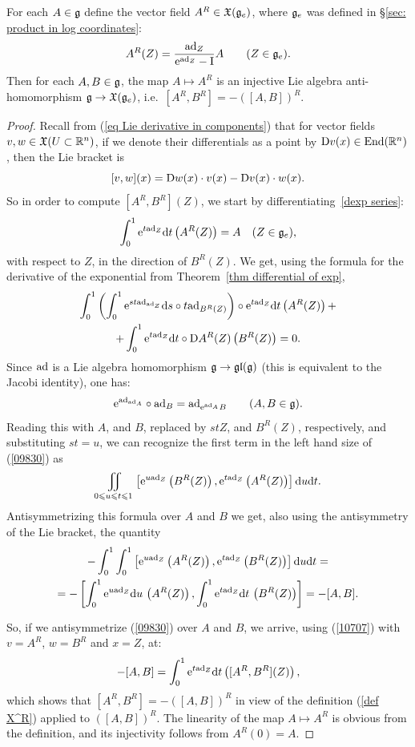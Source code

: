 \begin{lem}[{{\cite[Lem.~1.8.2]{DK}}}]
    For each $A\in\mathfrak{g}$ define the vector field $A^R\in \mathfrak{X}(\mathfrak{g}_e)$, where $\mathfrak{g}_e$ was defined in \S\ref{sec: product in log coordinates}:
    \[ A^R(Z)=\frac{\mathrm{ad}_Z}{\mathrm{e}^{\mathrm{ad}_Z}-\mathrm{I}}A\quad \quad (Z\in\mathfrak{g}_e). \label{def X^R}\]
    Then for each $A,B\in\mathfrak{g}$, the map $A\mapsto A^R$ is an injective Lie algebra anti-homomorphism $\mathfrak{g}\to \mathfrak{X}(\mathfrak{g}_e)$, i.e.\ $[A^R,B^R]=-([A,B])^R$.
\end{lem}
\begin{proof}
    Recall from (\ref{eq Lie derivative in components}) that for vector fields $v,w\in\mathfrak{X}(U\subset\mathbb{R}^n)$, if we denote their differentials as a point by $\mathrm{D} v(x)\in \operatorname{End}(\mathbb{R}^n)$, then the Lie bracket is
    \[[v,w](x)=\mathrm{D} w(x)\cdot v(x)-\mathrm{D} v(x)\cdot w(x).\label{10707}\]
    So in order to compute $[A^R,B^R](Z)$, we start by differentiating~\ref{dexp series}:
    \[\int_0^1 \mathrm{e}^{t\mathrm{ad}_Z}{\mathrm{d}} t \left(A^R(Z)\right)=A\quad (Z\in\mathfrak{g}_e),\]
    with respect to $Z$, in the direction of $B^R(Z)$. We get, using the formula for the derivative of the exponential from Theorem~\ref{thm differential of exp}, 
    \begin{multline}
        \int_0^1 \left(\int_0^1\mathrm{e}^{st\mathrm{ad}_{\mathrm{ad}_Z}} {\mathrm{d}} s\circ t\mathrm{ad}_{B^R(Z)}\right)\circ \mathrm{e}^{t\mathrm{ad}_Z}{\mathrm{d}} t\left(A^R(Z)\right)+\\
        +\int_0^1\mathrm{e}^{t\mathrm{ad}_Z}{\mathrm{d}} t\circ \mathrm{D} A^R(Z)\left(B^R(Z)\right)=0.\label{09830}
    \end{multline} 
    Since $\mathrm{ad}$ is a Lie algebra homomorphism $\mathfrak{g}\to\mathfrak{gl}(\mathfrak{g})$ (this is equivalent to the Jacobi identity), one has:
    \[\mathrm{e}^{\mathrm{ad}_{\mathrm{ad}_A}}\circ \mathrm{ad}_B=\mathrm{ad}_{\mathrm{e}^{\mathrm{ad}_A} B}\quad \quad (A,B\in\mathfrak{g}).\]
    Reading this with $A$, and $B$, replaced by $stZ$, and $B^R(Z)$, respectively, and substituting $st=u$, we can recognize the first term in the left hand size of (\ref{09830}) as
    \[\iint_{0\leqslant u\leqslant t\leqslant 1}\left[\mathrm{e}^{u\mathrm{ad}_Z}\left(B^R(Z)\right),\mathrm{e}^{t\mathrm{ad}_Z}\left(A^R(Z)\right)\right]{\mathrm{d}} u{\mathrm{d}} t.\]
    Antisymmetrizing this formula over $A$ and $B$  we get, also using the antisymmetry of the Lie bracket, the quantity
    \begin{multline}
        -\int_0^1\int_0^1\left[\mathrm{e}^{u\mathrm{ad}_Z}\left(A^R(Z)\right),\mathrm{e}^{t\mathrm{ad}_Z}\left(B^R(Z)\right)\right]{\mathrm{d}} u{\mathrm{d}} t=\\
        =-\left[\int_0^1\mathrm{e}^{u\mathrm{ad}_Z}{\mathrm{d}} u\, \left(A^R(Z)\right),\int_0^1\mathrm{e}^{t\mathrm{ad}_Z}{\mathrm{d}} t\, \left(B^R(Z)\right)\right]=-[A,B].
    \end{multline}

    So, if we antisymmetrize (\ref{09830}) over $A$ and $B$, we arrive, using (\ref{10707}) with $v=A^R$, $w=B^R$ and $x=Z$, at:
    \[-[A,B]=\int_0^1 \mathrm{e}^{t\mathrm{ad}_Z}{\mathrm{d}} t\left([A^R,B^R](Z)\right),\]
    which shows that $[A^R,B^R]=-([A,B])^R$ in view of the definition (\ref{def X^R}) applied to $([A,B])^R$. The linearity of the map $A\mapsto A^R$ is obvious from the definition, and its injectivity follows from $A^R(0)=A$.
\end{proof}
